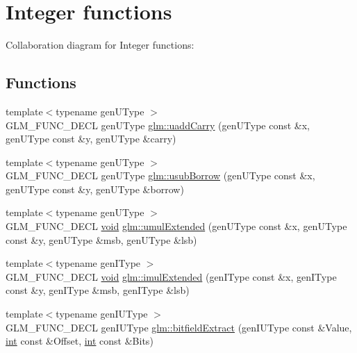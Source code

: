 \hypertarget{group__core__func__integer}{}\section{Integer functions}
\label{group__core__func__integer}
Collaboration diagram for Integer functions\+:
\subsection*{Functions}
\begin{DoxyCompactItemize}
\item 
{\footnotesize template$<$typename gen\+U\+Type $>$ }\\G\+L\+M\+\_\+\+F\+U\+N\+C\+\_\+\+D\+E\+C\+L gen\+U\+Type \hyperlink{group__core__func__integer_ga19276bb7adbe9f0d74515ae49e40b481}{glm\+::uadd\+Carry} (gen\+U\+Type const \&x, gen\+U\+Type const \&y, gen\+U\+Type \&carry)
\item 
{\footnotesize template$<$typename gen\+U\+Type $>$ }\\G\+L\+M\+\_\+\+F\+U\+N\+C\+\_\+\+D\+E\+C\+L gen\+U\+Type \hyperlink{group__core__func__integer_gae5b4a6cefd1e21fd2e1b8526b4c964a7}{glm\+::usub\+Borrow} (gen\+U\+Type const \&x, gen\+U\+Type const \&y, gen\+U\+Type \&borrow)
\item 
{\footnotesize template$<$typename gen\+U\+Type $>$ }\\G\+L\+M\+\_\+\+F\+U\+N\+C\+\_\+\+D\+E\+C\+L \hyperlink{_s_d_l__audio_8h_a52835ae37c4bb905b903cbaf5d04b05f}{void} \hyperlink{group__core__func__integer_gad991bf53779a4309a920bb7bfcf2639c}{glm\+::umul\+Extended} (gen\+U\+Type const \&x, gen\+U\+Type const \&y, gen\+U\+Type \&msb, gen\+U\+Type \&lsb)
\item 
{\footnotesize template$<$typename gen\+I\+Type $>$ }\\G\+L\+M\+\_\+\+F\+U\+N\+C\+\_\+\+D\+E\+C\+L \hyperlink{_s_d_l__audio_8h_a52835ae37c4bb905b903cbaf5d04b05f}{void} \hyperlink{group__core__func__integer_ga7d284e3ea5059cae9fe8f0fe1a76dd02}{glm\+::imul\+Extended} (gen\+I\+Type const \&x, gen\+I\+Type const \&y, gen\+I\+Type \&msb, gen\+I\+Type \&lsb)
\item 
{\footnotesize template$<$typename gen\+I\+U\+Type $>$ }\\G\+L\+M\+\_\+\+F\+U\+N\+C\+\_\+\+D\+E\+C\+L gen\+I\+U\+Type \hyperlink{group__core__func__integer_ga251d309beb171bf95117d2c301b2ad8b}{glm\+::bitfield\+Extract} (gen\+I\+U\+Type const \&Value, \hyperlink{_s_d_l__thread_8h_a6a64f9be4433e4de6e2f2f548cf3c08e}{int} const \&Offset, \hyperlink{_s_d_l__thread_8h_a6a64f9be4433e4de6e2f2f548cf3c08e}{int} const \&Bits)

\end{DoxyCompactItemize}
